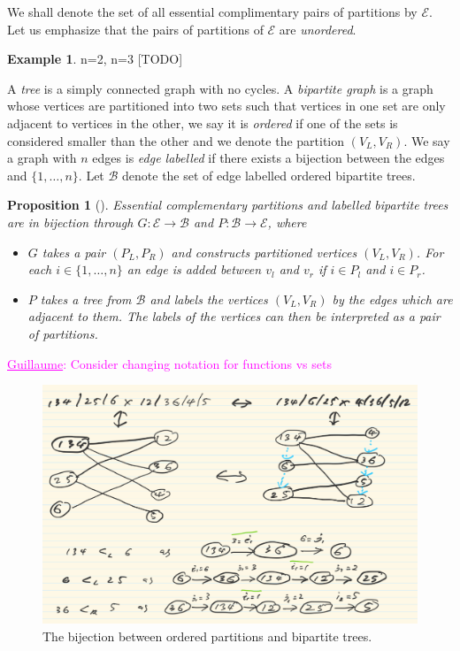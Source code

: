 \documentclass[11pt]{amsart}
\newtheorem{proposition}[thm]{Proposition}
\theoremstyle{definition}
\newtheorem{example}[thm]{Example}
\theoremstyle{remark}
\numberwithin{equation}{section}
\newcommand{\EC}{\mathcal{E}} %
\newcommand{\BT}{\mathcal{B}} %
\newcommand{\0}{\color{blue}{\mathsf{0}}}
\newcommand{\Guillaume}[1]{\textcolor{magenta}{\underline{Guillaume}: #1}}
\begin{document}
We shall denote the set of all essential complimentary pairs of partitions by $\EC$.
Let us emphasize that the pairs of partitions of $\EC$ are \emph{unordered}.

\begin{example}
n=2, n=3 [TODO]
\end{example}

A \emph{tree} is a simply connected graph with no cycles. 
A \emph{bipartite graph} is a graph whose vertices are partitioned into two sets such that vertices in one set are only adjacent to vertices in the other, we say it is \emph{ordered} if one of the sets is considered smaller than the other and we denote the partition $(V_L,V_R)$. 
We say a graph with $n$ edges is \emph{edge labelled} if there exists a bijection between the edges and $\{1,\dots,n\}$.
Let $\BT$ denote the set of edge labelled ordered bipartite trees.

\begin{proposition} [{\cite[Theorem 3]{kajitani1982number}}] 
\label{EC Graph Bijection}
Essential complementary partitions and labelled bipartite trees are in bijection through $G:\EC \to \BT$ and $P:\BT \to \EC$, where
\begin{itemize}
    \item $G$ takes a pair $(P_L,P_R)$ and constructs partitioned vertices $(V_L,V_R)$. For each $i \in  \{1,\dots,n\}$ an edge is added between $v_l$ and $v_r$ if $i\in P_l$ and $i \in P_r$. 
    \item $P$ takes a tree from $\BT$ and labels the vertices $(V_L,V_R)$ by the edges which are adjacent to them. The labels of the vertices can then be interpreted as a pair of partitions.
\end{itemize}
\end{proposition}
\Guillaume{Consider changing notation for functions vs sets}

\begin{figure}
\begin{center}
\includegraphics{Images/bijections_example.png}
\end{center}
\caption{The bijection between ordered partitions and bipartite trees.}
\end{figure}
\end{document}
